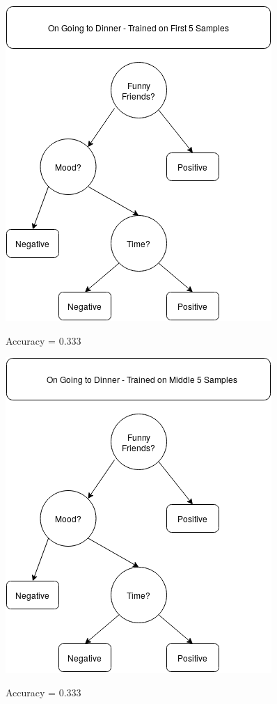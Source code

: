 \documentclass{article}
\begin{document}
\begin{center}
    \includegraphics[scale=0.65]{First.png}
    
    \noindent Accuracy = 0.333
    
\end{center}

\begin{center}
    \includegraphics[scale=0.65]{Middle.png}
    
    \noindent Accuracy = 0.333
    
\end{center}
\end{document}
